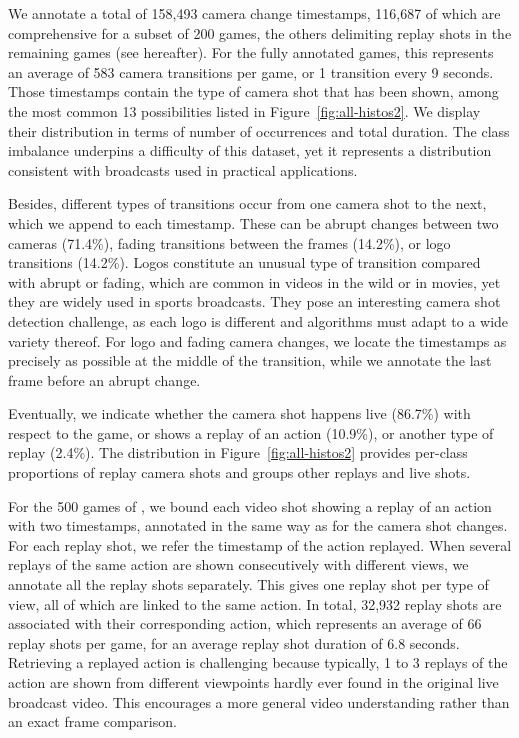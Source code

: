 \documentclass[final]{cvsports}
\begin{document}
 We annotate a total of 158,493 camera change timestamps, 116,687 of which are comprehensive for a subset of 200 games, the others delimiting replay shots in the remaining games (see hereafter). For the fully annotated games, this represents an average of 583 camera transitions per game, or 1 transition every 9 seconds. Those timestamps contain the type of camera shot that has been shown, among the most common 13 possibilities listed in Figure~\ref{fig:all-histos2}. We display their distribution in terms of number of occurrences and total duration. The class imbalance underpins a difficulty of this dataset, yet it represents a distribution consistent with broadcasts used in practical applications.



Besides, different types of transitions occur from one camera shot to the next, which we append to each timestamp. These can be abrupt changes between two cameras (71.4\%), fading transitions between the frames (14.2\%), or logo transitions (14.2\%). 
Logos constitute an unusual type of transition compared with abrupt or fading, which are common in videos in the wild or in movies, yet they are widely used in sports broadcasts. They pose an interesting camera shot detection challenge, as each logo is different and algorithms must adapt to a wide variety thereof. For logo and fading camera changes, we locate the timestamps as precisely as possible at the middle of the transition, while we annotate the last frame before an abrupt change.

Eventually, we indicate whether the camera shot happens live (86.7\%) with respect to the game, or shows a replay of an action (10.9\%), or another type of replay (2.4\%). The distribution in Figure~\ref{fig:all-histos2} provides per-class proportions of replay camera shots and groups other replays and live shots. 



 For the 500 games of \SoccerNet, we bound each video shot showing a replay of an action with two timestamps, annotated in the same way as for the camera shot changes. For each replay shot, we refer the timestamp of the action replayed. When several replays of the same action are shown consecutively with different views, we annotate all the replay shots separately. This gives one replay shot per type of view, all of which are linked to the same action. In total, 32,932 replay shots are associated with their corresponding action, which represents an average of 66 replay shots per game, for an average replay shot duration of 6.8 seconds. 
Retrieving a replayed action is challenging because typically, 1 to 3 replays of the action are shown from different viewpoints hardly ever found in the original live broadcast video. This encourages a more general video understanding rather than an exact frame comparison. 
\end{document}
